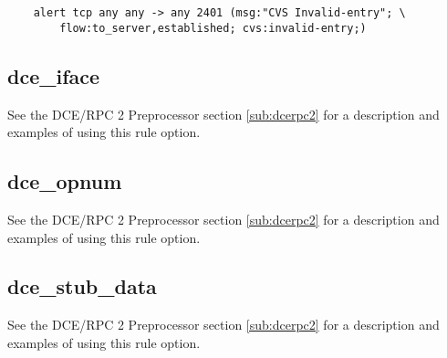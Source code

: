 \documentclass[english]{report}
\begin{document}
\begin{verbatim}
    alert tcp any any -> any 2401 (msg:"CVS Invalid-entry"; \
        flow:to_server,established; cvs:invalid-entry;)
\end{verbatim}

\subsection{dce\_iface}

See the DCE/RPC 2 Preprocessor section \ref{sub:dcerpc2} for a description and
examples of using this rule option.

\subsection{dce\_opnum}

See the DCE/RPC 2 Preprocessor section \ref{sub:dcerpc2} for a description and
examples of using this rule option.

\subsection{dce\_stub\_data}

See the DCE/RPC 2 Preprocessor section \ref{sub:dcerpc2} for a description and
examples of using this rule option.

%

%
%
%
%
\end{document}
